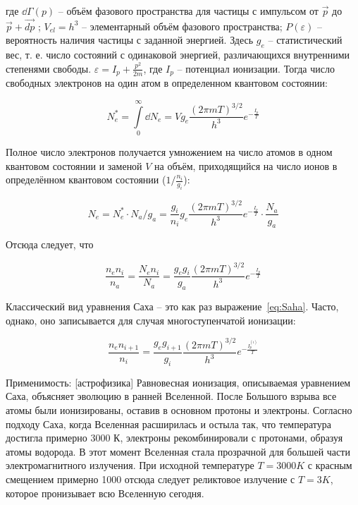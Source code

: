 \documentclass[10pt, a4paper]{article}
\begin{document}
где $\dd\Gamma(p)$ -- объём фазового пространства для частицы с импульсом от $\vec{p}$ до $\vec{p}+\vec{dp}$ ; $V_{el} = h^3$ -- элементарный объём фазового пространства; $P(\varepsilon)$ -- вероятность наличия частицы с заданной энергией. Здесь $g_e$ -- статистический вес, т. е. число состояний с одинаковой энергией, различающихся внутренними степенями свободы. $\varepsilon = I_p + \frac{p^2}{2m}$, где $I_p$ -- потенциал ионизации. Тогда число свободных электронов на один атом в определенном
квантовом состоянии:

\begin{equation*}
	N_e^{*} = \int\limits_{0}^{\infty} \dd N_e = Vg_e\frac{(2\pi mT)^{3/2}}{h^3}e^{-\frac{I_p}{T}}
\end{equation*}

Полное число электронов получается умножением на число атомов в одном квантовом состоянии и заменой $V$ на объём, приходящийся на число ионов в определённом квантовом состоянии ($1/\frac{n_i}{g_i}$):

\begin{equation*}
	N_e = N_e^{*} \cdot N_a/g_a = \frac{g_i}{n_i} g_e\frac{(2\pi mT)^{3/2}}{h^3}e^{-\frac{I_p}{T}} \cdot \frac{N_a}{g_a}
\end{equation*}

Отсюда следует, что

\begin{equation} \label{eq:Saha}
	\frac{n_en_i}{n_a} = \frac{N_en_i}{N_a} = \frac{g_eg_i}{g_a} \frac{(2\pi mT)^{3/2}}{h^3}e^{-\frac{I_p}{T}}
\end{equation}

Классический вид уравнения Саха -- это как раз выражение~\eqref{eq:Saha}. Часто, однако, оно записывается для случая многоступенчатой ионизации:

\begin{equation*}
	\frac{n_en_{i+1}}{n_i} = \frac{g_eg_{i+1}}{g_i} \frac{(2\pi mT)^{3/2}}{h^3}e^{-\frac{I_p^{(i)}}{T}}
\end{equation*}

Применимость: [астрофизика] Равновесная ионизация, описываемая уравнением Саха, объясняет эволюцию в ранней Вселенной. После Большого взрыва все атомы были ионизированы, оставив в основном протоны и электроны. Согласно подходу Саха, когда Вселенная расширилась и остыла так, что температура достигла примерно 3000 К, электроны рекомбинировали с протонами, образуя атомы водорода. В этот момент Вселенная стала прозрачной для большей части электромагнитного излучения. При исходной температуре $T = 3000 K$ с красным смещением примерно 1000 отсюда следует реликтовое излучение с $T = 3 K$, которое пронизывает всю Вселенную сегодня. 
\end{document}
